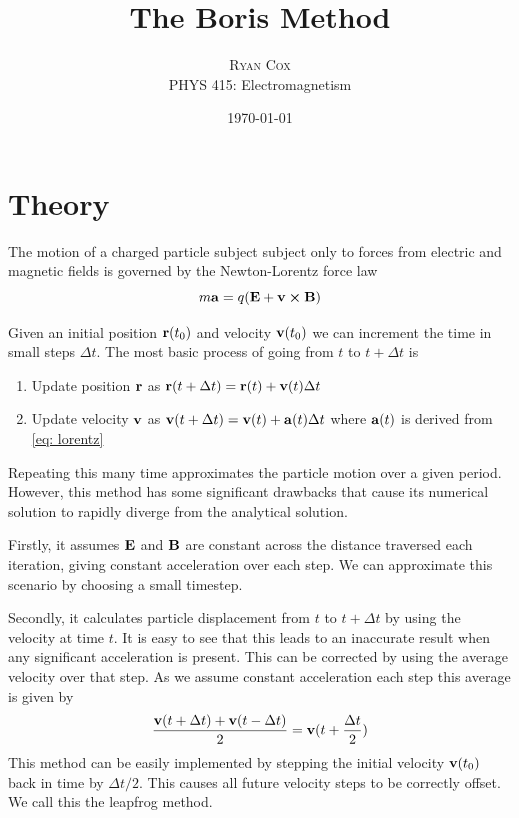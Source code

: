 \documentclass[twoside]{article}
\title{The Boris Method} %
\author{%
\textsc{Ryan Cox} \\[1ex] %
\normalsize PHYS 415: Electromagnetism\\ %
}
\date{\today} %
\begin{document}
\maketitle

\tableofcontents

\section{Theory}

The motion of a charged particle subject subject only to forces from electric and magnetic fields is governed by the Newton-Lorentz force law
\begin{equation} \label{eq: lorentz}
    m\vb{a} = q(\vb{E}+\vb{v}\cp\vb{B})
\end{equation}

Given an initial position $\vb{r}(t_0)$ and velocity $\vb{v}(t_0)$ we can increment the time in small steps $\Delta t$. The most basic process of going from $t$ to $t+\Delta t$ is
\begin{enumerate}
    \item Update position $\vb{r}$ as $\vb{r}(t+\Delta t) = \vb{r}(t) + \vb{v}(t)\Delta t$
    \item Update velocity $\vb{v}$ as $\vb{v}(t+\Delta t) = \vb{v}(t) + \vb{a}(t)\Delta t$ where $\vb{a}(t)$ is derived from \autoref{eq: lorentz}
\end{enumerate}
Repeating this many time approximates the particle motion over a given period. However, this method has some significant drawbacks that cause its numerical solution to rapidly diverge from the analytical solution.

Firstly, it assumes $\vb{E}$ and $\vb{B}$ are constant across the distance traversed each iteration, giving constant acceleration over each step. We can approximate this scenario by choosing a small timestep.

Secondly, it calculates particle displacement from $t$ to $t+\Delta t$ by using the velocity at time $t$. It is easy to see that this leads to an inaccurate result when any significant acceleration is present. This can be corrected by using the average velocity over that step. As we assume constant acceleration each step this average is given by
\begin{equation}
    \frac{\vb{v}(t+\Delta t)+\vb{v}(t-\Delta t)}{2} = \vb{v}(t+\frac{\Delta t}{2})
\end{equation}
This method can be easily implemented by stepping the initial velocity $\vb{v}(t_0)$ back in time by $\Delta t/2$. This causes all future velocity steps to be correctly offset. We call this the leapfrog method.\cite{velocityintegration}
\end{document}
